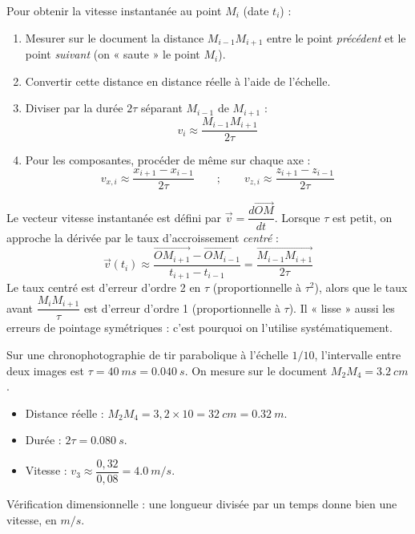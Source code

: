 \documentclass[11pt]{article}
\begin{document}
\begin{methode}
Pour obtenir la vitesse instantanée au point $M_i$ (date $t_i$) :
\begin{enumerate}
\item Mesurer sur le document la distance $M_{i-1}M_{i+1}$ entre le point \emph{précédent} et le point \emph{suivant} (on « saute » le point $M_i$).
\item Convertir cette distance en distance réelle à l'aide de l'échelle.
\item Diviser par la durée $2\tau$ séparant $M_{i-1}$ de $M_{i+1}$ :
\[ v_i \approx \dfrac{M_{i-1}M_{i+1}}{2\tau} \]
\item Pour les composantes, procéder de même sur chaque axe :
\[ v_{x,i} \approx \dfrac{x_{i+1}-x_{i-1}}{2\tau} \qquad ; \qquad v_{z,i} \approx \dfrac{z_{i+1}-z_{i-1}}{2\tau} \]
\end{enumerate}
\end{methode}

\begin{propriete}
Le vecteur vitesse instantanée est défini par $\vec{v} = \dfrac{d\overrightarrow{OM}}{dt}$. Lorsque $\tau$ est petit, on approche la dérivée par le taux d'accroissement \emph{centré} :
\[ \vec{v}(t_i) \approx \dfrac{\overrightarrow{OM_{i+1}} - \overrightarrow{OM_{i-1}}}{t_{i+1}-t_{i-1}} = \dfrac{\overrightarrow{M_{i-1}M_{i+1}}}{2\tau} \]
Le taux centré est d'erreur d'ordre 2 en $\tau$ (proportionnelle à $\tau^2$), alors que le taux avant $\dfrac{M_iM_{i+1}}{\tau}$ est d'erreur d'ordre 1 (proportionnelle à $\tau$). Il « lisse » aussi les erreurs de pointage symétriques : c'est pourquoi on l'utilise systématiquement.
\end{propriete}

\begin{exemplebox}
Sur une chronophotographie de tir parabolique à l'échelle $1/10$, l'intervalle entre deux images est $\tau = \SI{40}{ms} = \SI{0,040}{s}$. On mesure sur le document $M_2M_4 = \SI{3,2}{cm}$.
\begin{itemize}
\item Distance réelle : $M_2M_4 = 3,2 \times 10 = \SI{32}{cm} = \SI{0,32}{m}$.
\item Durée : $2\tau = \SI{0,080}{s}$.
\item Vitesse : $v_3 \approx \dfrac{0,32}{0,08} = \SI{4,0}{m/s}$.
\end{itemize}
Vérification dimensionnelle : une longueur divisée par un temps donne bien une vitesse, en $\si{m/s}$.
\end{exemplebox}
\end{document}
